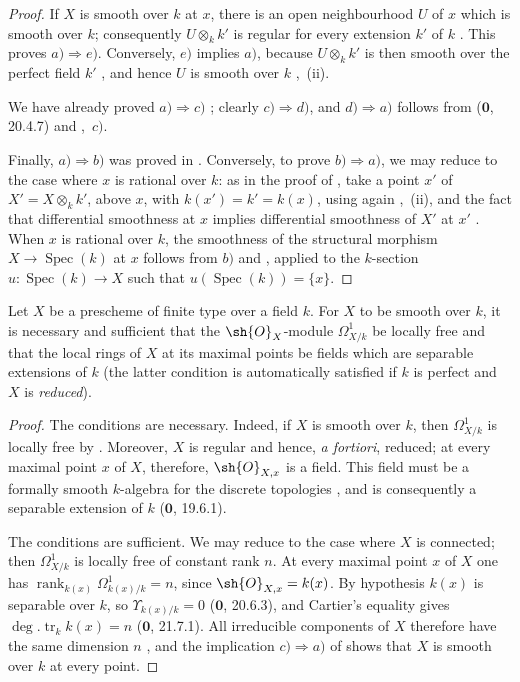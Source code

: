 \begin{proof}
If $X$ is smooth over $k$ at $x$, there is an open neighbourhood $U$ of $x$ which is smooth over $k$; consequently $U\otimes_k k'$ is regular for every extension $k'$ of $k$ .  This proves $a)\Rightarrow e)$.  Conversely, $e)$ implies $a)$, because $U\otimes_k k'$ is then smooth over the perfect field $k'$ , and hence $U$ is smooth over $k$ ,~(ii).

We have already proved $a)\Rightarrow c)$ ; clearly $c)\Rightarrow d)$, and $d)\Rightarrow a)$ follows from ($\mathbf{0}$, 20.4.7) and ,~$c)$.

Finally, $a)\Rightarrow b)$ was proved in .  Conversely, to prove $b)\Rightarrow a)$, we may reduce to the case where $x$ is rational over $k$: as in the proof of , take a point $x'$ of $X'=X\otimes_k k'$, above $x$, with $k(x')=k'=k(x)$, using again ,~(ii), and the fact that differential smoothness at $x$ implies differential smoothness of $X'$ at $x'$ .  When $x$ is rational over $k$, the smoothness of the structural morphism $X\to\operatorname{Spec}(k)$ at $x$ follows from $b)$ and , applied to the $k$-section $u:\operatorname{Spec}(k)\to X$ such that $u(\operatorname{Spec}(k))=\{x\}$.
\end{proof}

\begin{corollary}[17.15.6]
\label{IV.17.15.6}
Let $X$ be a prescheme of finite type over a field $k$.
For $X$ to be smooth over $k$, it is necessary and sufficient that the $\sh{O}_X$-module $\Omega^1_{X/k}$ be locally free and that the local rings of $X$ at its maximal points be fields which are separable extensions of $k$ (the latter condition is automatically satisfied if $k$ is perfect and $X$ is \emph{reduced}).
\end{corollary}

\begin{proof}
The conditions are necessary.  Indeed, if $X$ is smooth over $k$, then $\Omega^1_{X/k}$ is locally free by .  Moreover, $X$ is regular and hence, \emph{a fortiori}, reduced; at every maximal point $x$ of $X$, therefore, $\sh{O}_{X,x}$ is a field.  This field must be a formally smooth $k$-algebra for the discrete topologies , and is consequently a separable extension of $k$ ($\mathbf{0}$, 19.6.1).

The conditions are sufficient.
We may reduce to the case where $X$ is connected; then $\Omega^1_{X/k}$ is locally free of constant rank $n$.  At every maximal point $x$ of $X$ one has
$\operatorname{rank}_{k(x)}\Omega^1_{k(x)/k}=n$, since $\sh{O}_{X,x}=k(x)$.  By hypothesis $k(x)$ is separable over $k$, so $\Upsilon_{k(x)/k}=0$ ($\mathbf{0}$, 20.6.3), and Cartier's equality gives $\deg.\operatorname{tr}_k k(x)=n$ ($\mathbf{0}$, 21.7.1).  All irreducible components of $X$ therefore have the same dimension $n$ , and the implication $c)\Rightarrow a)$ of  shows that $X$ is smooth over $k$ at every point.
\end{proof}

